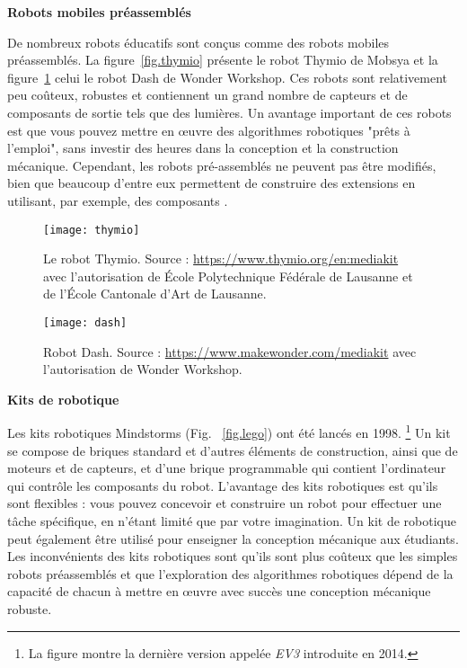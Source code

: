 \noindent\textbf{Robots mobiles préassemblés}

De nombreux robots éducatifs sont conçus comme des robots mobiles préassemblés. La figure~\ref{fig.thymio} présente le robot Thymio de Mobsya et la figure~\ref{fig.dash} celui le robot Dash de Wonder Workshop. Ces robots sont relativement peu coûteux, robustes et contiennent un grand nombre de capteurs et de composants de sortie tels que des lumières. Un avantage important de ces robots est que vous pouvez mettre en œuvre des algorithmes robotiques "prêts à l'emploi", sans investir des heures dans la conception et la construction mécanique. Cependant, les robots pré-assemblés ne peuvent pas être modifiés, bien que beaucoup d'entre eux permettent de construire des extensions en utilisant, par exemple, des composants \lego{}.

\begin{figure}
\begin{minipage}{.45\textwidth}
\begin{center}
\texttt{[image: thymio]}
\caption{Le robot Thymio. Source : \protect\url{https://www.thymio.org/en:mediakit} avec l'autorisation de \'{E}cole Polytechnique F\'{e}d\'{e}rale de Lausanne et de l'\'{E}cole Cantonale d'Art de Lausanne.}\label{fig.thymio}
\end{center}
\end{minipage}
\hspace{\fill}
\begin{minipage}{.45\textwidth}
\begin{center}
\texttt{[image: dash]}
\caption{Robot Dash. Source : \protect\url{https://www.makewonder.com/mediakit} avec l'autorisation de Wonder Workshop.}\label{fig.dash}
\end{center}
\end{minipage}
\end{figure}

\noindent\textbf{Kits de robotique}

Les kits robotiques \lego{} Mindstorms (Fig. ~\ref{fig.lego}) ont été lancés en 1998. \footnote{La figure montre la dernière version appelée \emph{EV3} introduite en 2014.} Un kit se compose de briques \lego{} standard et d'autres éléments de construction, ainsi que de moteurs et de capteurs, et d'une brique programmable qui contient l'ordinateur qui contrôle les composants du robot. L'avantage des kits robotiques est qu'ils sont flexibles : vous pouvez concevoir et construire un robot pour effectuer une tâche spécifique, en n'étant limité que par votre imagination. Un kit de robotique peut également être utilisé pour enseigner la conception mécanique aux étudiants. Les inconvénients des kits robotiques sont qu'ils sont plus coûteux que les simples robots préassemblés et que l'exploration des algorithmes robotiques dépend de la capacité de chacun à mettre en œuvre avec succès une conception mécanique robuste.

